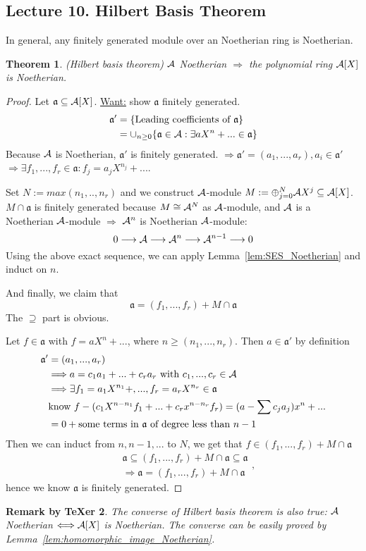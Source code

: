 \documentclass[11pt]{article}
\newtheorem{thm}{Theorem}[section]
\newtheorem{rmkt}[thm]{Remark by TeXer}
\newcommand{\sca}{{\mathfrak a}}
\newcommand{\cala}{{\cal A}}
\newcommand{\Lrta}{\Longrightarrow}
\newcommand{\lrta}{\longrightarrow}
\newcommand{\Llrta}{\Longleftrightarrow}
\begin{document}
\subsection{Lecture 10. Hilbert Basis Theorem}
In general, any finitely generated module over an Noetherian ring is Noetherian.

\begin{thm}\label{thm:Hilbert_Basis}(Hilbert basis theorem)
$\cala$ Noetherian $\Lrta $ the polynomial ring $\cala[X]$ is Noetherian.
\end{thm}

\begin{proof}
Let $\sca\subseteq \cala[X]$. \underline{Want:} show $\sca$ finitely generated. 
$$
\begin{aligned}
\sca' &=\{\text{Leading coefficients of $\sca$}\}\\
&= \cup_{n\geq 0}\{\sca\in\cala: \exists a X^n+...\in \sca\}
\end{aligned}
$$
Because $\cala$ is  Noetherian, $\sca'$ is finitely generated. $\Lrta\sca'=(a_1,...,a_r),a_i\in \sca'$ $\Lrta\exists f_1,...,f_r\in \sca: f_j=a_j X^{n_j}+...$.


Set $N:=max(n_1,..,n_r)$ and we construct $\cala$-module $M:=\oplus^N_{j=0}\cala X^j\subseteq \cala[X]$. $M\cap \sca$ is finitely generated because $M\cong \cala^N$ as $\cala$-module, and $\cala$ is a Noetherian $\cala$-module $\Lrta$ $\cala^n$ is Noetherian $\cala$-module:
$$
0\lrta \cala\lrta \cala^n\lrta \cala^{n-1}\lrta 0
$$
Using the above exact sequence, we can apply Lemma~\ref{lem:SES_Noetherian} and induct on $n$.

And finally, we claim that
$$
\sca=(f_1,...,f_r)+M\cap\sca
$$
The $\supseteq$ part is obvious.

Let $f\in \sca$ with $f=aX^n+...$, where $n\geq (n_1,...,n_r)$. Then $a\in\sca'$ by definition
$$
\begin{aligned}
\sca' &=(a_1,...,a_r)\\
&\Lrta a=c_1 a_1+...+c_r a_r\text{ with } c_1,...,c_r\in \cala\\
&\Lrta \exists f_1=a_1 X^{n_1}+,..., f_r=a_r X^{n_r}\in\sca\\
&\text{know } f-(c_1 X^{n-n_1}f_1+...+c_r x^{n-n_r}f_r)=(a-\sum c_j a_j)x^n+...\\
&=0+ \text{some terms in $\sca$ of degree less than $n-1$}
\end{aligned}
$$
Then we can induct from $n,n-1,...$ to $N$, we get that $f\in (f_1,...,f_r)+M\cap\sca$
$$
\begin{aligned}
&\sca\subseteq (f_1,...,f_r)+M\cap\sca\subseteq \sca\\
&\Lrta\sca=(f_1,...,f_r)+M\cap \sca
\end{aligned},
$$
hence we know $\sca$ is finitely generated.
\end{proof}
\begin{rmkt}
The converse of Hilbert basis theorem is also true: $\cala$ Noetherian $\Llrta\cala[X]$ is Noetherian. The converse can be easily proved by Lemma~\ref{lem:homomorphic_image_Noetherian}.
\end{rmkt}
\end{document}
